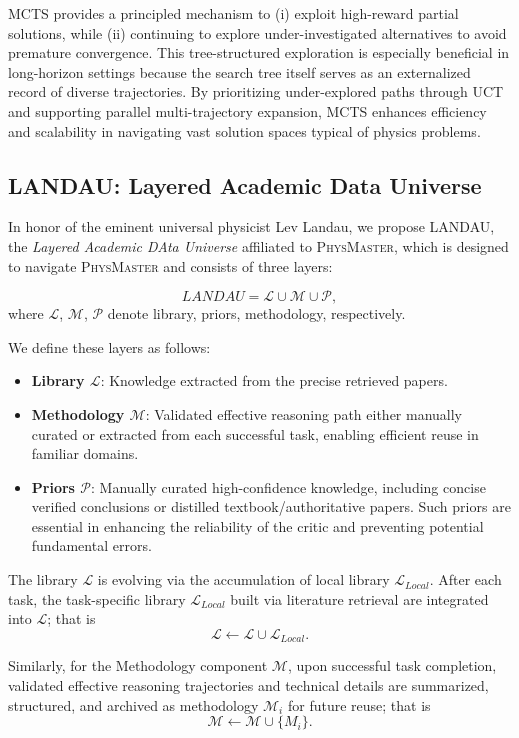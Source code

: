 \documentclass[11pt, a4paper, logo, copyright, nonumbering]{SAI}
\newcommand{\agent}{\textsc{PhysMaster}\xspace}
\newcommand{\knowledge}{\textsc{LANDAU}\xspace}
\begin{document}
MCTS provides a principled mechanism to (i) exploit high-reward partial solutions, while (ii) continuing to explore under-investigated alternatives to avoid premature convergence. This tree-structured exploration is especially beneficial in long-horizon settings because the search tree itself serves as an externalized record of diverse trajectories. By prioritizing under-explored paths through UCT and supporting parallel multi-trajectory expansion, MCTS enhances efficiency and scalability in navigating vast solution spaces typical of physics problems.

\subsection{\textsc{LANDAU}: Layered Academic Data Universe}

In honor of the eminent universal physicist Lev Landau, we propose \knowledge, the \emph{Layered Academic DAta Universe
} affiliated to \agent, which is designed to navigate \agent and consists of three layers:

\[
LANDAU = \mathcal{L} \cup \mathcal{M} \cup  \mathcal{P},
\]
where $\mathcal{L}$, $\mathcal{M}$, $\mathcal{P}$ denote library, priors, methodology, respectively.

We define these layers as follows:

\begin{itemize}
    \item \textbf{Library $\mathcal{L}$}: Knowledge extracted  from the precise retrieved papers.
    \item \textbf{Methodology $\mathcal{M}$}: Validated effective reasoning path either manually curated or extracted from each successful task, enabling efficient reuse in familiar domains.
    \item \textbf{Priors $\mathcal{P}$}: Manually curated high-confidence knowledge, including concise verified conclusions or distilled textbook/authoritative papers. Such priors are essential in enhancing the reliability of the critic and preventing potential fundamental errors.
\end{itemize}

The library $\mathcal{L}$ is evolving via the accumulation of local library $\mathcal{L}_{Local}$. After each task, the task-specific library $\mathcal{L}_{Local}$ built via literature retrieval are integrated into $\mathcal{L}$; that is
\[
\mathcal{L} \leftarrow \mathcal{L} \cup  \mathcal{L}_{Local}.
\]

Similarly, for the Methodology component $\mathcal{M}$, upon successful task completion, validated effective reasoning trajectories and technical details are summarized, structured, and archived as methodology $\mathcal{M}_{i}$ for future reuse; that is
\[
\mathcal{M}  \leftarrow \mathcal{M}  \cup \{ M_{i} \}.
\]
\end{document}
